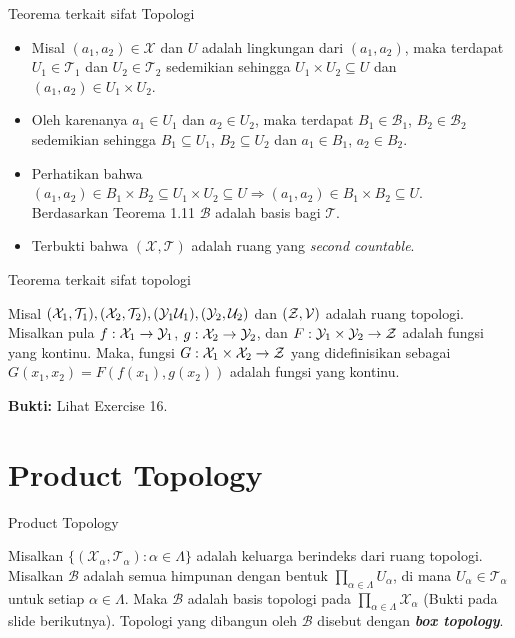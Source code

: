     \begin{frame}{Teorema terkait sifat Topologi}
        \begin{itemize}
            \item Misal $(a_1,a_2)\in \mathcal{X}$ dan $U$ adalah lingkungan dari $(a_1,a_2)$, maka terdapat $U_1\in \mathcal{T}_1$ dan $U_2\in \mathcal{T}_2$ sedemikian sehingga $U_1\times U_2\subseteq U$ dan $(a_1,a_2)\in U_1\times U_2$.
            \item Oleh karenanya $a_1\in U_1$ dan $a_2\in U_2$, maka terdapat $B_1\in \mathcal{B}_1$, $B_2\in \mathcal{B}_2$ sedemikian sehingga $B_1\subseteq U_1$, $B_2\subseteq U_2$ dan $a_1\in B_1$, $a_2\in B_2$.
            \item Perhatikan bahwa\\
            $(a_1,a_2)\in B_1\times B_2\subseteq U_1\times U_2\subseteq U\Rightarrow (a_1,a_2)\in B_1\times B_2\subseteq U$.\\
            Berdasarkan Teorema 1.11 $\mathcal{B}$ adalah basis bagi $\mathcal{T}$.
            \item Terbukti bahwa $(\mathcal{X},\mathcal{T})$ adalah ruang yang \textit{second countable}.
        \end{itemize}
    \end{frame}
    
    \begin{frame}{Teorema terkait sifat topologi}
        \begin{tcolorbox}[enhanced,title=Teorema 2.27,frame style tile={width=\paperwidth}{wallpaper}]
        Misal $(\mathcal{X}_1,\mathcal{T}_1), (\mathcal{X}_2,\mathcal{T}_2), (\mathcal{Y}_1\mathcal{U}_1), (\mathcal{Y}_2,\mathcal{U}_2)$ dan $(\mathcal{Z},\mathcal{V})$ adalah ruang topologi. Misalkan pula $f:\mathcal{X}_1\to\mathcal{Y}_1$, $g:\mathcal{X}_2\to\mathcal{Y}_2$, dan $F:\mathcal{Y}_1\times\mathcal{Y}_2\to\mathcal{Z}$ adalah fungsi yang kontinu. Maka, fungsi $G:\mathcal{X}_1\times\mathcal{X}_2\to\mathcal{Z}$ yang didefinisikan sebagai $G(x_1,x_2) = F(f(x_1),g(x_2))$ adalah fungsi yang kontinu.
        \end{tcolorbox}
        \textbf{Bukti:}
        Lihat Exercise 16.
    \end{frame}
    
    \section{Product Topology}
    \begin{frame}{Product Topology}
        \begin{tcolorbox}[enhanced,title=\textbf{Box Topology}, frame style tile={width=\paperwidth}{wallpaper}]
            Misalkan $\{(\mathcal{X}_{\alpha}, \mathcal{T}_{\alpha}):\alpha\in\Lambda\}$ adalah keluarga berindeks dari ruang topologi. Misalkan $\mathcal{B}$ adalah semua himpunan dengan bentuk $\prod_{\alpha\in\Lambda} U_\alpha$, di mana $U_\alpha\in\mathcal{T}_\alpha$ untuk setiap $\alpha\in\Lambda$. Maka $\mathcal{B}$ adalah basis topologi pada $\prod_{\alpha\in\Lambda} \mathcal{X}_\alpha$ (Bukti pada slide berikutnya). Topologi yang dibangun oleh $\mathcal{B}$ disebut dengan \textbf{\textit{box topology}}.
        \end{tcolorbox}
    \end{frame}
    

